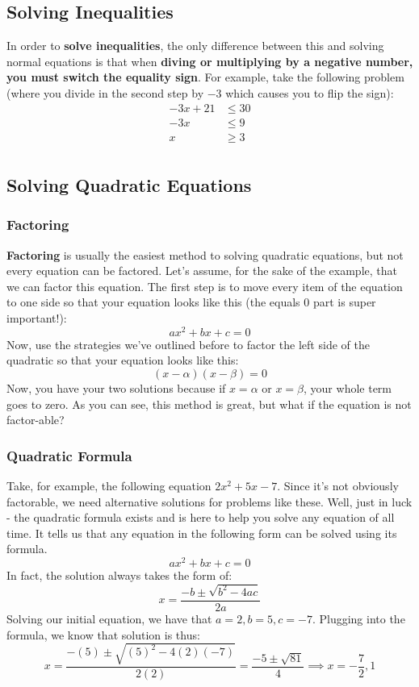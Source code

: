 \subsection{Solving Inequalities}
In order to \textbf{solve inequalities}, the only difference between this and solving normal equations is that when \textbf{diving or multiplying by a negative number, you must switch the equality sign}. For example, take the following problem (where you divide in the second step by $-3$ which causes you to flip the sign):
\begin{align*}
    -3x + 21 &\leq 30\\
    -3x &\leq 9\\
    x &\geq 3\\
\end{align*}
\subsection{Solving Quadratic Equations}
\subsubsection{Factoring}
\textbf{Factoring} is usually the easiest method to solving quadratic equations, but not every equation can be factored. Let's assume, for the sake of the example, that we can factor this equation. The first step is to move every item of the equation to one side so that your equation looks like this (the equals $0$ part is super important!):
$$
ax^2 + bx + c = 0
$$
Now, use the strategies we've outlined before to factor the left side of the quadratic so that your equation looks like this:
$$
(x - \alpha)(x - \beta) = 0
$$
Now, you have your two solutions because if $x = \alpha$ or $x = \beta$, your whole term goes to zero. As you can see, this method is great, but what if the equation is not factor-able? 
\subsubsection{Quadratic Formula}
Take, for example, the following equation $2x^2 + 5x - 7$. Since it's not obviously factorable, we need alternative solutions for problems like these. Well, just in luck - the quadratic formula exists and is here to help you solve any equation of all time. It tells us that any equation in the following form can be solved using its formula. 
$$
ax^2 + bx + c = 0
$$
In fact, the solution always takes the form of:
$$
x = \frac{-b \pm \sqrt{b^2 - 4ac}}{2a}
$$
Solving our initial equation, we have that $a = 2, b = 5, c = -7$. Plugging into the formula, we know that solution is thus:
$$
x = \frac{-(5) \pm \sqrt{(5)^2 - 4(2)(-7)}}{2(2)} = \frac{-5 \pm \sqrt{81}}{4} \implies x = -\frac{7}{2}, 1
$$
